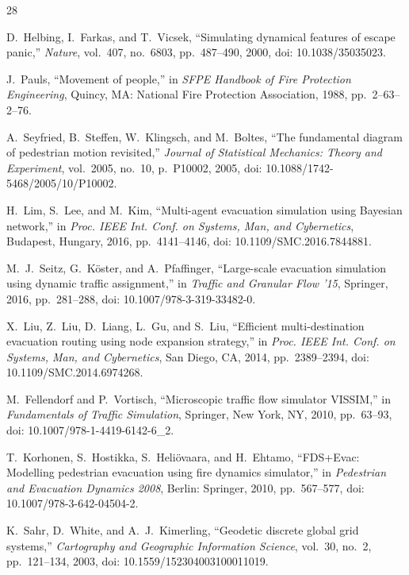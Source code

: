 \documentclass[conference]{IEEEtran}
\begin{document}
\begin{thebibliography}{28}

D.~Helbing, I.~Farkas, and T.~Vicsek, ``Simulating dynamical features of escape panic,'' \emph{Nature}, vol.~407, no.~6803, pp.~487--490, 2000, doi: 10.1038/35035023.

J.~Pauls, ``Movement of people,'' in \emph{SFPE Handbook of Fire Protection Engineering}, Quincy, MA: National Fire Protection Association, 1988, pp.~2--63--2--76.

A.~Seyfried, B.~Steffen, W.~Klingsch, and M.~Boltes, ``The fundamental diagram of pedestrian motion revisited,'' \emph{Journal of Statistical Mechanics: Theory and Experiment}, vol.~2005, no.~10, p.~P10002, 2005, doi: 10.1088/1742-5468/2005/10/P10002.

H.~Lim, S.~Lee, and M.~Kim, ``Multi-agent evacuation simulation using Bayesian network,'' in \emph{Proc. IEEE Int. Conf. on Systems, Man, and Cybernetics}, Budapest, Hungary, 2016, pp.~4141--4146, doi: 10.1109/SMC.2016.7844881.

M.~J.~Seitz, G.~K\"{o}ster, and A.~Pfaffinger, ``Large-scale evacuation simulation using dynamic traffic assignment,'' in \emph{Traffic and Granular Flow '15}, Springer, 2016, pp.~281--288, doi: 10.1007/978-3-319-33482-0.

X.~Liu, Z.~Liu, D.~Liang, L.~Gu, and S.~Liu, ``Efficient multi-destination evacuation routing using node expansion strategy,'' in \emph{Proc. IEEE Int. Conf. on Systems, Man, and Cybernetics}, San Diego, CA, 2014, pp.~2389--2394, doi: 10.1109/SMC.2014.6974268.

M.~Fellendorf and P.~Vortisch, ``Microscopic traffic flow simulator VISSIM,'' in \emph{Fundamentals of Traffic Simulation}, Springer, New York, NY, 2010, pp.~63--93, doi: 10.1007/978-1-4419-6142-6\_2.

T.~Korhonen, S.~Hostikka, S.~Heliövaara, and H.~Ehtamo, ``FDS+Evac: Modelling pedestrian evacuation using fire dynamics simulator,'' in \emph{Pedestrian and Evacuation Dynamics 2008}, Berlin: Springer, 2010, pp.~567--577, doi: 10.1007/978-3-642-04504-2.

K.~Sahr, D.~White, and A.~J.~Kimerling, ``Geodetic discrete global grid systems,'' \emph{Cartography and Geographic Information Science}, vol.~30, no.~2, pp.~121--134, 2003, doi: 10.1559/152304003100011019.


\end{thebibliography}
\end{document}
